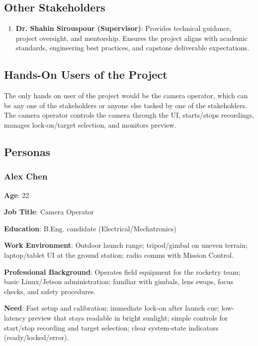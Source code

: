 \documentclass[12pt]{article}
\begin{document}
\subsection{Other Stakeholders}

\begin{enumerate}
  \item \textbf{Dr. Shahin Sirouspour (Supervisor)}: Provides
        technical guidance, project oversight, and mentorship. Ensures
        the project aligns with academic standards, engineering best
        practices, and capstone deliverable expectations.
\end{enumerate}

\subsection{Hands-On Users of the Project}

The only hands on user of the project would be the camera operator, which can
be any one of the stakeholders or anyone else tasked by one of the
stakeholders. The camera operator controls the camera through the UI,
starts/stops recordings, manages lock-on/target selection, and monitors
preview.

\subsection{Personas}

\subsubsection*{Alex Chen}

\textbf{Age}: 22

\textbf{Job Title}: Camera Operator

\textbf{Education}: B.Eng. candidate (Electrical/Mechatronics)

\textbf{Work Environment}: Outdoor launch range; tripod/gimbal on uneven terrain;
laptop/tablet UI at the ground station; radio comms with Mission Control.

\textbf{Professional Background}: Operates field equipment for the rocketry team; basic
Linux/Jetson administration; familiar with gimbals, lens swaps, focus checks,
and safety procedures.

\textbf{Need}: Fast setup and calibration; immediate lock-on
after launch cue; low-latency preview that stays readable in bright sunlight;
simple controls for start/stop recording and target selection; clear
system-state indicators (ready/locked/error).
\end{document}
